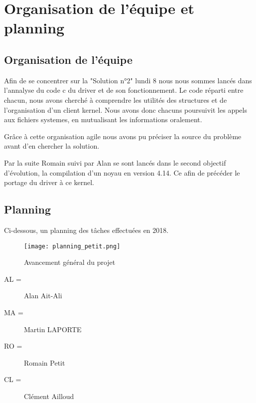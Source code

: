 
\chapter{Organisation de l'équipe et planning} %

\label{Chapter1} %


\section{Organisation de l'équipe}

Afin de se concentrer sur la "Solution n°2" lundi 8 nous nous sommes lancés dans
l'annalyse du code c du driver et de son fonctionnement. Le code réparti
entre chacun, nous avons cherché à comprendre les utilités des structures et de
l'organisation d'un client kernel. Nous avons donc chacuns poursuivit les appels
aux fichiers systemes, en mutualisant les informations oralement.

Grâce à cette organisation agile nous avons pu préciser la source du problème
avant d'en chercher la solution.

Par la suite Romain suivi par Alan se sont lancés dans le second objectif
d'évolution, la compilation d'un noyau en version 4.14. Ce afin de précéder le
portage du driver à ce kernel.

\section{Planning}

Ci-dessous, un planning des tâches effectuées en 2018.

\begin{figure}[th]
    \centering
    \texttt{[image: planning\_petit.png]}
    \decoRule
    \caption{Avancement général du projet}
    \label{fig:planning}
\end{figure}
\begin{description}
    \item[AL =] Alan Ait-Ali
    \item[MA =] Martin LAPORTE
    \item[RO =]  Romain Petit
    \item[CL =] Clément Ailloud
  \end{description}
  
